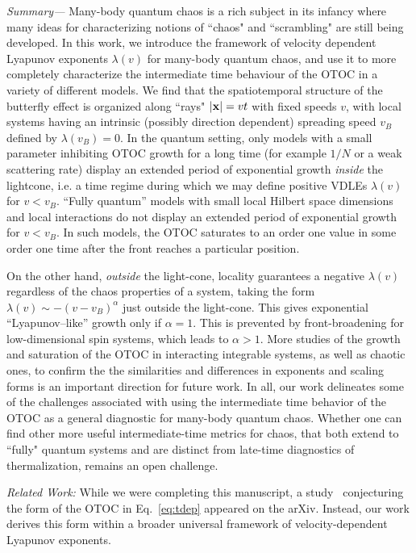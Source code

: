 \documentclass[aps,prl,reprint,superscriptaddress, longbibliography]{revtex4-1}
\newcommand{\vb}{v_B}
\newcommand{\lamv}{\lambda(v)}
\begin{document}
\emph{Summary---} Many-body quantum chaos is a rich subject in its infancy where many ideas for characterizing notions of ``chaos" and ``scrambling" are still being developed. In this work, we introduce the framework of velocity dependent Lyapunov exponents $\lambda(v)$ for many-body quantum chaos, and use it to more completely characterize the intermediate time behaviour of the OTOC in a variety of different models. 
We find that the spatiotemporal structure of the butterfly effect is organized along ``rays" $|{\bf x}|= vt$ with fixed speeds $v$, with local systems having an intrinsic (possibly direction dependent) spreading speed $\vb$ defined by $\lambda(\vb)=0$. In the quantum setting, only models with a small parameter inhibiting OTOC growth for a long time (for example $1/N$ or a weak scattering rate) 
 display an extended period of exponential growth \emph{inside} the lightcone, i.e. a time regime during which we may define positive VDLEs $\lamv$ for $v <\vb$.  
``Fully quantum'' models with small local Hilbert space dimensions and local interactions do not display an extended period of exponential growth for $v < \vb$. In such models, the OTOC saturates to an order one value in some order one time after the front reaches a particular position. 

On the other hand, \emph{outside} the light-cone, locality  guarantees a negative $\lambda(v)$ regardless of the chaos properties of a system, taking the form ${\lamv \sim -(v-\vb)^\alpha}$ just outside the light-cone. This gives exponential ``Lyapunov--like'' growth only if $\alpha=1$. This is prevented by front-broadening for low-dimensional spin systems, which leads to $\alpha>1$. More studies of the growth and saturation of the OTOC in interacting integrable systems, as well as chaotic ones, to confirm the the similarities and differences in exponents and scaling forms is an important direction for future work.  In all, our work delineates some of the challenges associated with using the intermediate time behavior of the OTOC as a general diagnostic for many-body quantum chaos. Whether one can find other more useful intermediate-time metrics for  chaos, that both extend to ``fully" quantum systems and are distinct from late-time diagnostics of thermalization, remains an open challenge.

\vspace{2pt}
\emph{Related Work:} While we were completing this manuscript, a study~\cite{Swingle_otocMPS} conjecturing the form of the OTOC in Eq.~\eqref{eq:tdep} appeared on the arXiv. Instead, our work derives this form within a broader universal framework of velocity-dependent Lyapunov exponents. 
\end{document}

